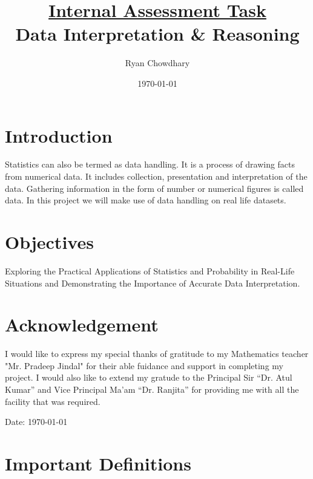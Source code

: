 \documentclass[12pt]{article}
\title{\vspace{-3.5cm}\Huge{\underline{\textbf{Internal Assessment Task}} \\ Data Interpretation \& Reasoning}}
\author{\vspace{-3mm}Ryan Chowdhary}
\affil{\vspace{-4mm}{\small{\it X `D', Roll no. 17, SOSE DWARKA SEC-10 }}}
\date{\vspace{-0.75cm}\today}
\begin{document}
\maketitle

\section{Introduction}
Statistics can also be termed as data handling. It is a process of drawing facts from numerical data. It includes collection, presentation and interpretation of the data. Gathering information in the form of number or numerical figures is called data.
In this project we will make use of data handling on real life datasets.

\section{Objectives}
Exploring the Practical Applications of Statistics and Probability in Real-Life Situations and Demonstrating the Importance of Accurate Data Interpretation.

\section{Acknowledgement}
I would like to express my special thanks of gratitude to my Mathematics teacher "Mr. Pradeep Jindal" for their able fuidance and support in completing my project.
I would also like to extend my gratude to the Principal Sir ``Dr. Atul Kumar'' and Vice Principal Ma'am ``Dr. Ranjita'' for providing me with all the facility that was required.

Date: \today

\pagebreak

\section{Important Definitions}
\end{document}
